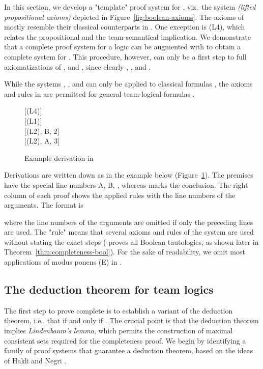\documentclass[a4paper,english,fleqn,11pt,final]{scrartcl}
\makeatletter
\newcommand{\ie}{i.e.\@\xspace}
\newcommand{\imp}{\rightarrow}
\newcommand{\timp}{\rightarrowtriangle}
\newcommand{\Deriv}[1]{{\normalfont\textsf{#1}}}
\theoremstyle{plain}
\theoremstyle{definition}
\makeatother
\begin{document}
In this section, we develop a "template" proof system for , viz.\ the system  \emph{(lifted propositional axioms)} depicted in Figure~\ref{fig:boolean-axioms}.
The axioms of  mostly resemble their classical counterparts in .
One exception is \Deriv{(L4)}, which relates the propositional and the team-semantical implication.
We demonstrate that a complete proof system for a logic  can be augmented with  to obtain a complete system for .
This procedure, however, can only be a first step to full axiomatizations of ,  and , since clearly , , and .



While the systems , ,  and  can only be applied to classical formulas , the axioms and rules in  are permitted for general team-logical formulas .


\begin{figure}[b]
\centering
\fitchprf{
\pline[A ]{\xi \timp \alpha} \\
\pline[B ]{\xi \timp (\alpha \imp \beta)}
}
{
\pline[1 ]{(\alpha \imp \beta) \timp (\alpha \timp \beta)}[\Deriv{(L4)}]\\
\pline[2 ]{\xi \timp ((\alpha \imp \beta) \timp (\alpha \timp \beta))}[\Deriv{(L1)}]\\
\pline[3 ]{\xi \timp (\alpha \timp \beta)}[\Deriv{(L2)}, B, 2]\\
\pline[\slider]{\xi \timp \beta}[\Deriv{(L2)}, A, 3]
}
\caption{Example derivation in \label{fig:example-deriv}}
\end{figure}

Derivations are written down as in the example below (Figure~\ref{fig:example-deriv}).
The premises have the special line numbers A, B, \textellipsis, whereas \slider marks the conclusion.
The right column of each proof shows the applied rules with the line numbers of the arguments.
The format is

where the line numbers of the arguments are omitted if only the preceding lines are used.
The "rule"  means that several axioms and rules of the system  are used without stating the exact steps ( proves all Boolean tautologies, as shown later in Theorem~\ref{thm:completeness-bool}).
For the sake of readability, we omit most applications of modus ponens \Deriv{(E)} in .

\subsection{The deduction theorem for team logics}

The first step to prove  complete is to establish a variant of the deduction theorem, \ie, that  if and only if .
The crucial point is that the deduction theorem implies \emph{Lindenbaum's lemma}, which permits the construction of maximal consistent sets required for the completeness proof.
We begin by identifying a family of proof systems that guarantee a deduction theorem, based on the ideas of Hakli and Negri \cite{deduction_fail}.
\end{document}
